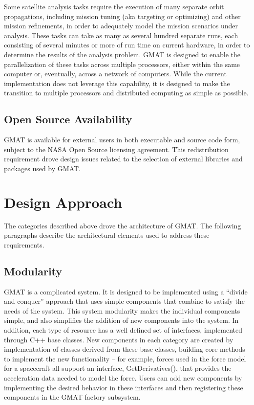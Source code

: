 Some satellite analysis tasks require the execution of many separate orbit propagations, including
mission tuning (aka targeting or optimizing) and other mission refinements, in order to adequately
model the mission scenarios under analysis.  These tasks can take as many as several hundred
separate runs, each consisting of several minutes or more of run time on current hardware, in order
to determine the results of the analysis problem.  GMAT is designed to enable the parallelization of
these tasks across multiple processors, either within the same computer or, eventually, across a
network of computers.  While the current implementation does not leverage this capability, it is
designed to make the transition to multiple processors and distributed computing as simple as
possible.

\subsection{Open Source Availability}

GMAT is available for external users in both executable and source code form, subject to the NASA
Open Source licensing agreement.  This redistribution requirement drove design issues related to
the selection of external libraries and packages used by GMAT.

\section{Design Approach}

The categories described above drove the architecture of GMAT.  The following paragraphs describe
the architectural elements used to address these requirements.

\subsection{Modularity}

GMAT is a complicated system.  It is designed to be implemented using a ``divide and conquer''
approach that uses simple components that combine to satisfy the needs of the system.  This system
modularity makes the individual components simple, and also simplifies the addition of new
components into the system.  In addition, each type of resource has a well defined set of
interfaces, implemented through C++ base classes.  New components in each category are created by
implementation of classes derived from these base classes, building core methods to implement the
new functionality -- for example, forces used in the force model for a spacecraft all support an
interface, GetDerivatives(), that provides the acceleration data needed to model the force.  Users
can add new components by implementing the desired behavior in these interfaces and then registering
these components in the GMAT factory subsystem.

